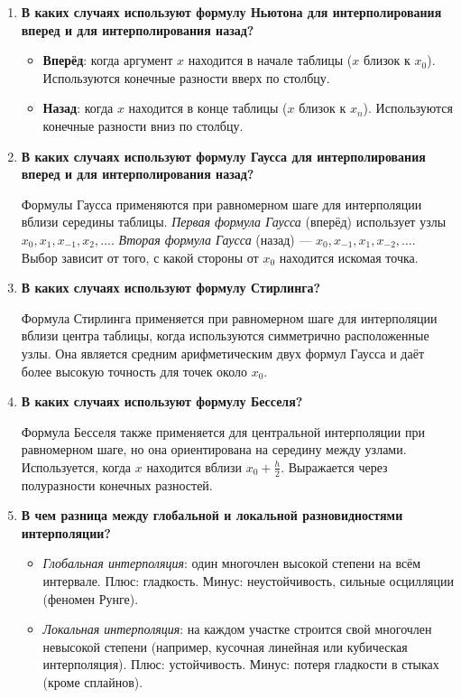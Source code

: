 \documentclass[a4paper,12pt]{article}
\begin{document}
\begin{enumerate}
	\textit{Конечные разности} применяются при равномерном шаге узлов (\( h = x_{i+1} - x_i = const \)). \textit{Разделённые разности} — при произвольном (неравномерном) расположении узлов.

\item \textbf{В каких случаях используют формулу Ньютона для интерполирования вперед и для интерполирования назад?}

	\begin{itemize}
		\item \textbf{Вперёд}: когда аргумент \( x \) находится в начале таблицы (\( x \) близок к \( x_0 \)). Используются конечные разности вверх по столбцу.
		\item \textbf{Назад}: когда \( x \) находится в конце таблицы (\( x \) близок к \( x_n \)). Используются конечные разности вниз по столбцу.
	\end{itemize}

\item \textbf{В каких случаях используют формулу Гаусса для интерполирования вперед и для интерполирования назад?}

	Формулы Гаусса применяются при равномерном шаге для интерполяции вблизи середины таблицы. \textit{Первая формула Гаусса} (вперёд) использует узлы \( x_0, x_1, x_{-1}, x_2, \dots \). \textit{Вторая формула Гаусса} (назад) — \( x_0, x_{-1}, x_1, x_{-2}, \dots \). Выбор зависит от того, с какой стороны от \( x_0 \) находится искомая точка.

\item \textbf{В каких случаях используют формулу Стирлинга?}

	Формула Стирлинга применяется при равномерном шаге для интерполяции вблизи центра таблицы, когда используются симметрично расположенные узлы. Она является средним арифметическим двух формул Гаусса и даёт более высокую точность для точек около \( x_0 \).

\item \textbf{В каких случаях используют формулу Бесселя?}

	Формула Бесселя также применяется для центральной интерполяции при равномерном шаге, но она ориентирована на середину между узлами. Используется, когда \( x \) находится вблизи \( x_0 + \frac{h}{2} \). Выражается через полуразности конечных разностей.

\item \textbf{В чем разница между глобальной и локальной разновидностями интерполяции?}

	\begin{itemize}
		\item \textit{Глобальная интерполяция}: один многочлен высокой степени на всём интервале. Плюс: гладкость. Минус: неустойчивость, сильные осцилляции (феномен Рунге).
		\item \textit{Локальная интерполяция}: на каждом участке строится свой многочлен невысокой степени (например, кусочная линейная или кубическая интерполяция). Плюс: устойчивость. Минус: потеря гладкости в стыках (кроме сплайнов).
	\end{itemize}


\end{enumerate}
\end{document}
